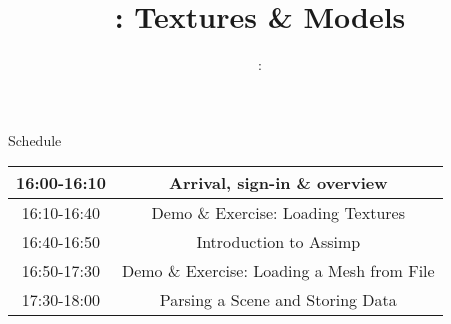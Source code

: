 \usepackage{../../beamerthemeFalmouthGamesAcademy}
\usepackage{multimedia}
\graphicspath{ {../../} }




\usepackage[normalem]{ulem}
\usepackage{wasysym}

\usepackage{pdfpages}

\usepackage{caption}
\captionsetup[figure]{font=scriptsize,labelfont=scriptsize}

\usetikzlibrary{arrows,automata}




\title{\sessionnumber: Textures \& Models}
\subtitle{\modulecode: \moduletitle}

\frame{\titlepage} 





\begin{frame}{Schedule}
	\begin{center}
		\begin{tabular}{|c c|}
			\hline
			16:00-16:10 & Arrival, sign-in \& overview \\
			\hline
			16:10-16:40 & Demo \& Exercise: Loading Textures \\
			\hline
			16:40-16:50 & Introduction to Assimp\\
			16:50-17:30 & Demo \& Exercise: Loading a Mesh from File \\
			17:30-18:00 & Parsing a Scene and Storing Data \\
			\hline
		\end{tabular}
	\end{center}
\end{frame}





